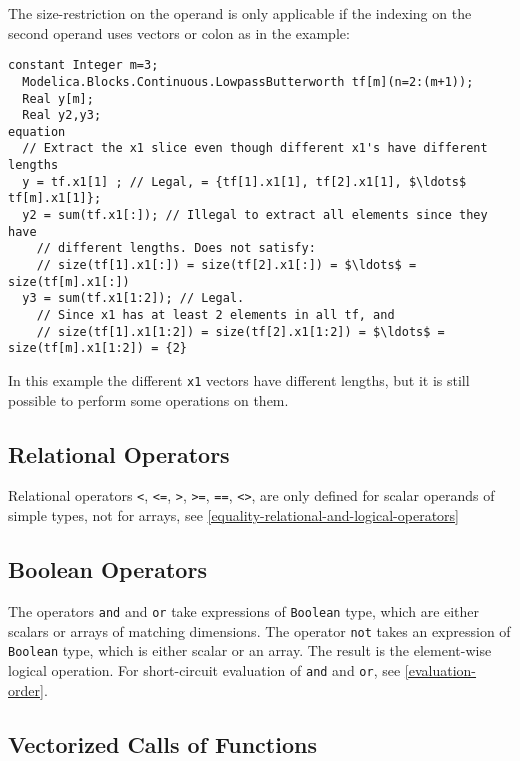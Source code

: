 \begin{example}
The size-restriction on the operand is only applicable if the indexing on the second operand uses vectors or colon as in the example:
\begin{lstlisting}[language=modelica]
  constant Integer m=3;
  Modelica.Blocks.Continuous.LowpassButterworth tf[m](n=2:(m+1));
  Real y[m];
  Real y2,y3;
equation
  // Extract the x1 slice even though different x1's have different lengths
  y = tf.x1[1] ; // Legal, = {tf[1].x1[1], tf[2].x1[1], $\ldots$ tf[m].x1[1]};
  y2 = sum(tf.x1[:]); // Illegal to extract all elements since they have
    // different lengths. Does not satisfy:
    // size(tf[1].x1[:]) = size(tf[2].x1[:]) = $\ldots$ = size(tf[m].x1[:])
  y3 = sum(tf.x1[1:2]); // Legal.
    // Since x1 has at least 2 elements in all tf, and
    // size(tf[1].x1[1:2]) = size(tf[2].x1[1:2]) = $\ldots$ = size(tf[m].x1[1:2]) = {2}
\end{lstlisting}
In this example the different \lstinline!x1! vectors have different lengths,
but it is still possible to perform some operations on them.
\end{example}

\subsection{Relational Operators}

Relational operators \lstinline!<!, \lstinline!<=!, \lstinline!>!,
\lstinline!>=!, \lstinline!==!, \lstinline!<>!, are only defined for
scalar operands of simple types, not for arrays, see \autoref{equality-relational-and-logical-operators}

\subsection{Boolean Operators}

The operators \lstinline!and! and \lstinline!or! take expressions of \lstinline!Boolean! type, which are either scalars or arrays of matching dimensions.  The operator \lstinline!not!
takes an expression of \lstinline!Boolean! type, which is either scalar or an array.  The result is the element-wise logical operation.  For short-circuit evaluation of \lstinline!and!
and \lstinline!or!, see \autoref{evaluation-order}.

\subsection{Vectorized Calls of Functions}

